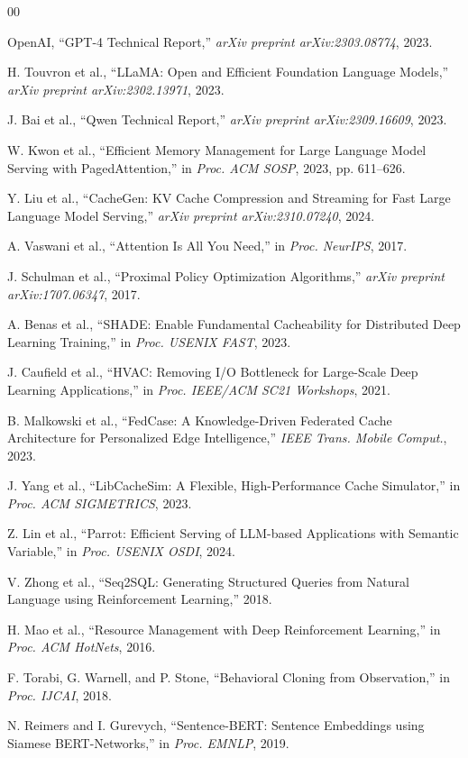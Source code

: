 \documentclass[conference]{IEEEtran}
\begin{document}
\begin{thebibliography}{00}

OpenAI, ``GPT-4 Technical Report,'' \textit{arXiv preprint arXiv:2303.08774}, 2023.

H. Touvron et al., ``LLaMA: Open and Efficient Foundation Language Models,'' \textit{arXiv preprint arXiv:2302.13971}, 2023.

J. Bai et al., ``Qwen Technical Report,'' \textit{arXiv preprint arXiv:2309.16609}, 2023.

W. Kwon et al., ``Efficient Memory Management for Large Language Model Serving with PagedAttention,'' in \textit{Proc. ACM SOSP}, 2023, pp. 611--626.

Y. Liu et al., ``CacheGen: KV Cache Compression and Streaming for Fast Large Language Model Serving,'' \textit{arXiv preprint arXiv:2310.07240}, 2024.

A. Vaswani et al., ``Attention Is All You Need,'' in \textit{Proc. NeurIPS}, 2017.

J. Schulman et al., ``Proximal Policy Optimization Algorithms,'' \textit{arXiv preprint arXiv:1707.06347}, 2017.

A. Benas et al., ``SHADE: Enable Fundamental Cacheability for Distributed Deep Learning Training,'' in \textit{Proc. USENIX FAST}, 2023.

J. Caufield et al., ``HVAC: Removing I/O Bottleneck for Large-Scale Deep Learning Applications,'' in \textit{Proc. IEEE/ACM SC21 Workshops}, 2021.

B. Malkowski et al., ``FedCase: A Knowledge-Driven Federated Cache Architecture for Personalized Edge Intelligence,'' \textit{IEEE Trans. Mobile Comput.}, 2023.

J. Yang et al., ``LibCacheSim: A Flexible, High-Performance Cache Simulator,'' in \textit{Proc. ACM SIGMETRICS}, 2023.

Z. Lin et al., ``Parrot: Efficient Serving of LLM-based Applications with Semantic Variable,'' in \textit{Proc. USENIX OSDI}, 2024.

V. Zhong et al., ``Seq2SQL: Generating Structured Queries from Natural Language using Reinforcement Learning,'' 2018.

H. Mao et al., ``Resource Management with Deep Reinforcement Learning,'' in \textit{Proc. ACM HotNets}, 2016.

F. Torabi, G. Warnell, and P. Stone, ``Behavioral Cloning from Observation,'' in \textit{Proc. IJCAI}, 2018.

N. Reimers and I. Gurevych, ``Sentence-BERT: Sentence Embeddings using Siamese BERT-Networks,'' in \textit{Proc. EMNLP}, 2019.

\end{thebibliography}
\end{document}
